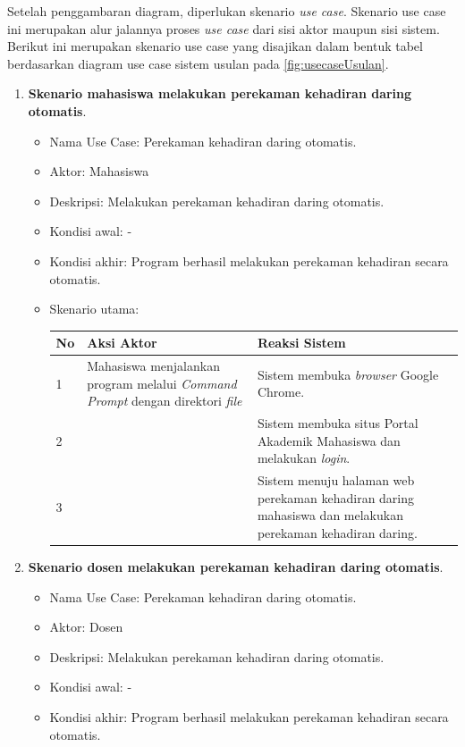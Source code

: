 Setelah penggambaran diagram, diperlukan skenario \textit{use case}. Skenario use case ini merupakan alur jalannya proses \textit{use case} dari sisi aktor maupun sisi sistem. Berikut ini merupakan skenario use case yang disajikan dalam bentuk tabel berdasarkan diagram use case sistem usulan pada \ref{fig:usecaseUsulan}.
\begin{enumerate}
	\item \textbf{Skenario mahasiswa melakukan perekaman kehadiran daring otomatis}.
	\begin{itemize}
		\item Nama Use Case: Perekaman kehadiran daring otomatis.
		\item Aktor: Mahasiswa
		\item Deskripsi: Melakukan perekaman kehadiran daring otomatis.
		\item Kondisi awal: -
		\item Kondisi akhir: Program berhasil melakukan perekaman kehadiran secara otomatis.
		\item Skenario utama:
		\begin{table}[h!]
			\centering
			\label{}
			\begin{tabular}{ | m{0.5cm} | m{7cm}| m{6cm} | } 
				\hline
				No & Aksi Aktor & Reaksi Sistem \\ 
				\hline
				1 & Mahasiswa menjalankan program melalui \textit{Command Prompt} dengan direktori \textit{file} & Sistem membuka \textit{browser} Google Chrome.
				\\ 
				\hline
				2 &  & Sistem membuka situs Portal Akademik Mahasiswa dan melakukan \textit{login}.
				\\ 
				\hline
				3 &  & Sistem menuju halaman web perekaman kehadiran daring mahasiswa dan melakukan perekaman kehadiran daring.
				\\ 
				\hline
			\end{tabular}
		\end{table}	
	\end{itemize}
	\item \textbf{Skenario dosen melakukan perekaman kehadiran daring otomatis}.
	\begin{itemize}
		\item Nama Use Case: Perekaman kehadiran daring otomatis.
		\item Aktor: Dosen
		\item Deskripsi: Melakukan perekaman kehadiran daring otomatis.
		\item Kondisi awal: -
		\item Kondisi akhir: Program berhasil melakukan perekaman kehadiran secara otomatis.

\end{itemize}
\end{enumerate}
